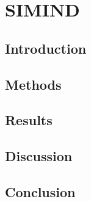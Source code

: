 \chapter{SIMIND}
\label{chapterlabel}

\blindtext

\section{Introduction}

\section{Methods}

\section{Results}

\section{Discussion}

\section{Conclusion}